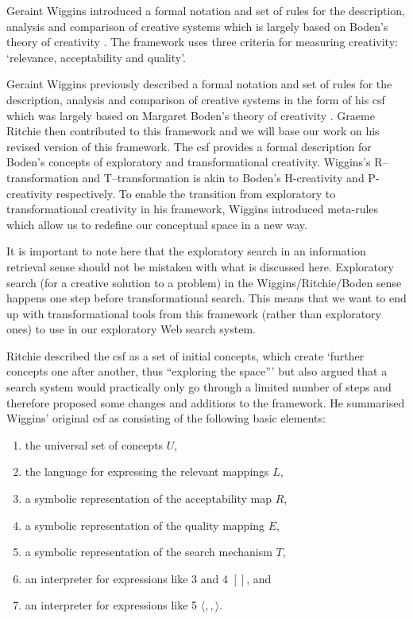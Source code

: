 \spirals


Geraint Wiggins introduced a formal notation and set of rules for the description, analysis and comparison of creative systems \citeyear{Wiggins2006} which is largely based on Boden's theory of creativity \citeyear{Boden2003}. The framework uses three criteria for measuring creativity: `relevance, acceptability and quality'.

Geraint Wiggins previously described a formal notation and set of rules for the description, analysis and comparison of creative systems in the form of his \gls{csf} \autocite{Wiggins2006} which was largely based on Margaret Boden's theory of creativity \autocite{Boden2003}. Graeme Ritchie then contributed to this framework \autocite{Ritchie2012} and we will base our work on his revised version of this framework. The \gls{csf} provides a formal description for Boden's concepts of exploratory and transformational creativity. Wiggins's R–transformation and T–transformation is akin to Boden's H-creativity and P-creativity respectively. To enable the transition from exploratory to transformational creativity in his framework, Wiggins introduced meta-rules which allow us to redefine our conceptual space in a new way.

It is important to note here that the exploratory search in an information retrieval sense should not be mistaken with what is discussed here. Exploratory search (for a creative solution to a problem) in the Wiggins/Ritchie/Boden sense happens one step before transformational search. This means that we want to end up with transformational tools from this framework (rather than exploratory ones) to use in our exploratory Web search system.

Ritchie described the \gls{csf} as a set of initial concepts, which create `further concepts one after another, thus ``exploring the space''' but also argued that a search system would practically only go through a limited number of steps and therefore proposed some changes and additions to the framework. He summarised Wiggins' original \gls{csf} as consisting of the following basic elements:

\begin{enumerate}
	\item the universal set of concepts $U$,
	\item the language for expressing the relevant mappings $L$,
	\item a symbolic representation of the acceptability map $R$,
	\item a symbolic representation of the quality mapping $E$,
  \item a symbolic representation of the search mechanism $T$,
	\item an interpreter for expressions like 3 and 4 $[ ]$, and
	\item an interpreter for expressions like 5 $\langle , , \rangle$.
\end{enumerate}

